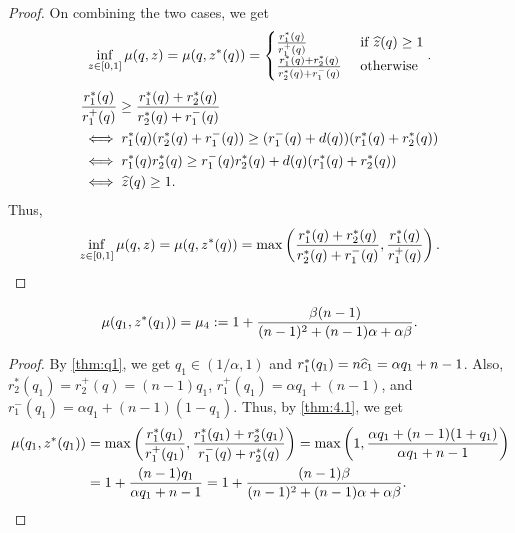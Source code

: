\begin{proof}
On combining the two cases, we get
\[ \inf_{z \in [0, 1]} \mu(q, z) = \mu(q, z^*(q)) = \begin{cases}
    \frac{r_1^*(q)}{r_1^+(q)} & \text{ if } \widehat{z}(q) \ge 1
    \\ \frac{r_1^*(q) + r_2^*(q)}{r_2^*(q) + r_1^-(q)} & \text{ otherwise}
\end{cases}. \]
\begin{align*}
& \frac{r_1^*(q)}{r_1^+(q)} \ge \frac{r_1^*(q) + r_2^*(q)}{r_2^*(q) + r_1^-(q)}
\\ &\iff r_1^*(q)(r_2^*(q) + r_1^-(q)) \ge (r_1^-(q) + d(q))(r_1^*(q) + r_2^*(q))
\\ &\iff r_1^*(q)r_2^*(q) \ge r_1^-(q)r_2^*(q) + d(q)(r_1^*(q) + r_2^*(q))
\\ &\iff \widehat{z}(q) \ge 1.
\end{align*}
Thus,
\[ \inf_{z \in [0, 1]} \mu(q, z) = \mu(q, z^*(q))
    = \max\left(\frac{r_1^*(q)+r_2^*(q)}{r_2^*(q) + r_1^-(q)}, \frac{r_1^*(q)}{r_1^+(q)}\right).
    \qedhere \]
\end{proof}

\begin{lemma}
\label{thm:mu4}
\[ \mu(q_1, z^*(q_1)) = \mu_4 := 1 + \frac{\beta(n-1)}{(n-1)^2 + (n-1)\alpha + \alpha\beta}. \]
\end{lemma}
\begin{proof}
By \cref{thm:q1}, we get $q_1 \in (1/\alpha, 1)$
and $r_1^*(q_1) = n\widehat{c}_1 = \alpha q_1 + n-1$.
Also, $r_2^*(q_1) = r_2^+(q) = (n-1)q_1$,
$r_1^+(q_1) = \alpha q_1 + (n-1)$, and $r_1^-(q_1) = \alpha q_1 + (n-1)(1-q_1)$.
Thus, by \cref{thm:4.1}, we get
\begin{align*}
\mu(q_1, z^*(q_1))
    &= \max\left(\frac{r_1^*(q_1)}{r_1^+(q_1)}, \frac{r_1^*(q_1)+r_2^*(q_1)}{r_1^-(q)+r_2^*(q)}\right)
    = \max\left(1, \frac{\alpha q_1 + (n-1)(1+q_1)}{\alpha q_1 + n-1}\right)
\\ &= 1 + \frac{(n-1)q_1}{\alpha q_1 + n-1}
    = 1 + \frac{(n-1)\beta}{(n-1)^2 + (n-1)\alpha + \alpha\beta}.
\qedhere
\end{align*}
\end{proof}

